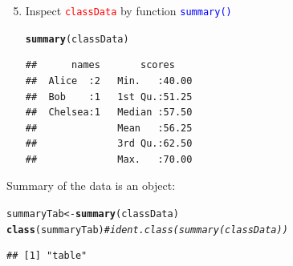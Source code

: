 \documentclass[12pt]{beamer}\usepackage[]{graphicx}\usepackage[]{color}
\makeatletter
\newcommand{\hlcom}[1]{\textcolor[rgb]{0.678,0.584,0.686}{\textit{#1}}}%
\newcommand{\hlstd}[1]{\textcolor[rgb]{0.345,0.345,0.345}{#1}}%
\newcommand{\hlkwb}[1]{\textcolor[rgb]{0.69,0.353,0.396}{#1}}%
\newcommand{\hlkwd}[1]{\textcolor[rgb]{0.737,0.353,0.396}{\textbf{#1}}}%
\newenvironment{kframe}{%
 \def\at@end@of@kframe{}%
 \ifinner\ifhmode%
  \def\at@end@of@kframe{\end{minipage}}%
  \begin{minipage}{\columnwidth}%
 \fi\fi%
 \def\FrameCommand##1{\hskip\@totalleftmargin \hskip-\fboxsep
 \colorbox{shadecolor}{##1}\hskip-\fboxsep
     \hskip-\linewidth \hskip-\@totalleftmargin \hskip\columnwidth}%
 \MakeFramed {\advance\hsize-\width
   \@totalleftmargin\z@ \linewidth\hsize
   \@setminipage}}%
 {\par\unskip\endMakeFramed%
 \at@end@of@kframe}
\newenvironment{knitrout}{}{} %
\makeatother
\begin{document}

\begin{frame}[fragile]
\begin{enumerate}
\setcounter{enumi}{4}
 \item Inspect \textcolor{red}{\texttt{classData}} by function \textcolor{blue}{\texttt{summary()}} 
\begin{knitrout}
\color{fgcolor}\begin{kframe}
\begin{alltt}
\hlkwd{summary}\hlstd{(classData)}
\end{alltt}
\begin{verbatim}
##      names       scores     
##  Alice  :2   Min.   :40.00  
##  Bob    :1   1st Qu.:51.25  
##  Chelsea:1   Median :57.50  
##              Mean   :56.25  
##              3rd Qu.:62.50  
##              Max.   :70.00
\end{verbatim}
\end{kframe}
\end{knitrout}
\end{enumerate}

 Summary of the data is an object: 

\begin{knitrout}\footnotesize
{}\color{fgcolor}\begin{kframe}
\begin{alltt}
\hlstd{summaryTab} \hlkwb{<-} \hlkwd{summary}\hlstd{(classData)}
\hlkwd{class}\hlstd{(summaryTab)} \hlcom{# ident. class(summary(classData))}
\end{alltt}
\begin{verbatim}
## [1] "table"
\end{verbatim}
\end{kframe}
\end{knitrout}

\end{frame}

\end{document}
